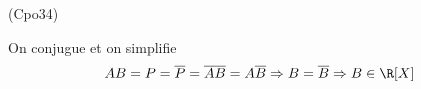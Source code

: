 \begin{tiny}(Cpo34)\end{tiny} On conjugue et on simplifie
\begin{displaymath}
 AB = P=\overline{P} = \overline{AB} = A\overline{B}\Rightarrow B=\overline{B} \Rightarrow
B \in \R[X] 
\end{displaymath}
